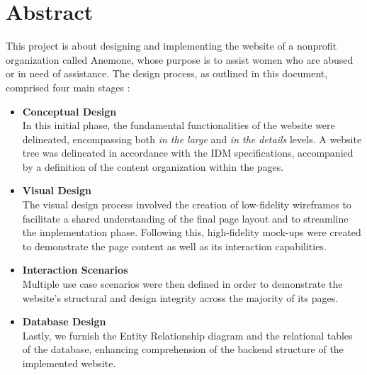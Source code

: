 \section{Abstract}
This project is about designing and implementing the website of a nonprofit organization called Anemone,
whose purpose is to assist women who are abused or in need of assistance.
The design process, as outlined in this document, comprised four main stages :
\begin{itemize}
    \item \textbf{Conceptual Design}\\
    In this initial phase, the fundamental functionalities of the website were delineated, 
    encompassing both \textit{in the large} and \textit{in the details} levels. 
    A website tree was delineated in accordance with the IDM specifications, 
    accompanied by a definition of the content organization within the pages.
    \item \textbf{Visual Design}\\
    The visual design process involved the creation of low-fidelity wireframes to facilitate a shared understanding 
    of the final page layout and to streamline the implementation phase. 
    Following this, high-fidelity mock-ups were created to demonstrate the page content as well as its interaction capabilities.
    \item \textbf{Interaction Scenarios}\\
    Multiple use case scenarios were then defined in order to demonstrate the website's structural and 
    design integrity across the majority of its pages.
    \item \textbf{Database Design}\\
    Lastly, we furnish the Entity Relationship diagram and the relational tables of the database,
    enhancing comprehension of the backend structure of the implemented website.
\end{itemize}